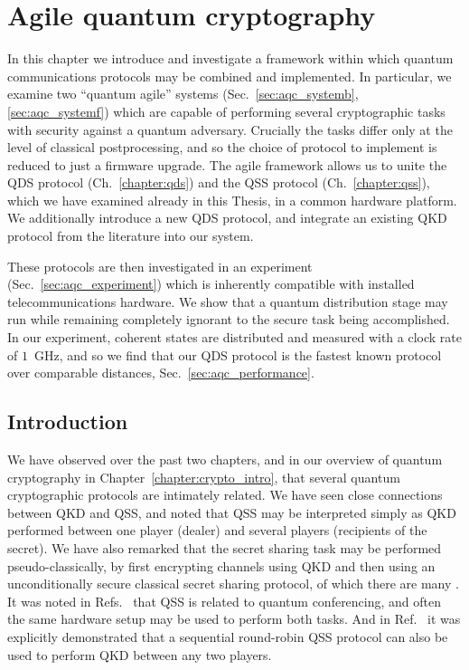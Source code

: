 \chapter{Agile quantum cryptography}\label{chapter:aqc}

In this chapter we introduce and investigate a framework within which quantum communications protocols may be combined and implemented. In particular, we examine two ``quantum agile'' systems (Sec.~\ref{sec:aqc_systemb}, \ref{sec:aqc_systemf}) which are capable of performing several cryptographic tasks with security against a quantum adversary. Crucially the tasks differ only at the level of classical postprocessing, and so the choice of protocol to implement is reduced to just a firmware upgrade. The agile framework allows us to unite the QDS protocol (Ch.~\ref{chapter:qds}) and the QSS protocol (Ch.~\ref{chapter:qss}), which we have examined already in this Thesis, in a common hardware platform. We additionally introduce a new QDS protocol, and integrate an existing QKD protocol from the literature into our system.

These protocols are then investigated in an experiment (Sec.~\ref{sec:aqc_experiment}) which is inherently compatible with installed telecommunications hardware. We show that a quantum distribution stage may run while remaining completely ignorant to the secure task being accomplished. In our experiment, coherent states are distributed and measured with a clock rate of $1$~GHz, and so we find that our QDS protocol is the fastest known protocol over comparable distances, Sec.~\ref{sec:aqc_performance}.

\section{Introduction}

We have observed over the past two chapters, and in our overview of quantum cryptography in Chapter~\ref{chapter:crypto_intro}, that several quantum cryptographic protocols are intimately related. We have seen close connections between QKD and QSS, and noted that QSS may be interpreted simply as QKD performed between one player (dealer) and several players (recipients of the secret). We have also remarked that the secret sharing task may be performed pseudo-classically, by first encrypting channels using QKD and then using an unconditionally secure classical secret sharing protocol, of which there are many \cite{Shamir1979, Blakley1979, Schneier1996}. It was noted in Refs.~\cite{Hillery1999, Chen2005a, Wu2016, Ottaviani2017b} that QSS is related to quantum conferencing, and often the same hardware setup may be used to perform both tasks. And in Ref.~\cite{Grice2019} it was explicitly demonstrated that a sequential round-robin QSS protocol can also be used to perform QKD between any two players. 

